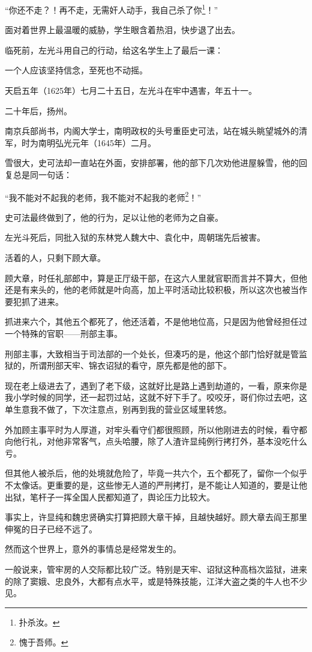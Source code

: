 \begin{multicols}{\theparacolNo}
“你还不走？！再不走，无需奸人动手，我自己杀了你\footnote{扑杀汝。}！”

面对着世界上最温暖的威胁，学生眼含着热泪，快步退了出去。

临死前，左光斗用自己的行动，给这名学生上了最后一课：

一个人应该坚持信念，至死也不动摇。

天启五年（1625年）七月二十五日，左光斗在牢中遇害，年五十一。

二十年后，扬州。

南京兵部尚书，内阁大学士，南明政权的头号重臣史可法，站在城头眺望城外的清军，时为南明弘光元年（1645年）二月。

雪很大，史可法却一直站在外面，安排部署，他的部下几次劝他进屋躲雪，他的回复总是同一句话：

“我不能对不起我的老师，我不能对不起我的老师\footnote{愧于吾师。}！”

史可法最终做到了，他的行为，足以让他的老师为之自豪。

左光斗死后，同批入狱的东林党人魏大中、袁化中，周朝瑞先后被害。

活着的人，只剩下顾大章。

顾大章，时任礼部郎中，算是正厅级干部，在这六人里就官职而言并不算大，但他还是有来头的，他的老师就是叶向高，加上平时活动比较积极，所以这次也被当作要犯抓了进来。

抓进来六个，其他五个都死了，他还活着，不是他地位高，只是因为他曾经担任过一个特殊的官职——刑部主事。

刑部主事，大致相当于司法部的一个处长，但凑巧的是，他这个部门恰好就是管监狱的，所谓刑部天牢、锦衣诏狱的看守，原先都是他的部下。

现在老上级进去了，遇到了老下级，这就好比是路上遇到劫道的，一看，原来你是我小学时候的同学，还一起罚过站，这就不好下手了。咬咬牙，哥们你过去吧，这单生意我不做了，下次注意点，别再到我的营业区域里转悠。

外加顾主事平时为人厚道，对牢头看守们都很照顾，所以他刚进去的时候，看守都向他行礼，对他非常客气，点头哈腰，除了人渣许显纯例行拷打外，基本没吃什么亏。

但其他人被杀后，他的处境就危险了，毕竟一共六个，五个都死了，留你一个似乎不太像话。更重要的是，这些惨无人道的严刑拷打，是不能让人知道的，要是让他出狱，笔杆子一挥全国人民都知道了，舆论压力比较大。

事实上，许显纯和魏忠贤确实打算把顾大章干掉，且越快越好。顾大章去阎王那里伸冤的日子已经不远了。

然而这个世界上，意外的事情总是经常发生的。

一般说来，管牢房的人交际都比较广泛。特别是天牢、诏狱这种高档次监狱，进来的除了窦娥、忠良外，大都有点水平，或是特殊技能，江洋大盗之类的牛人也不少见。


\end{multicols}
